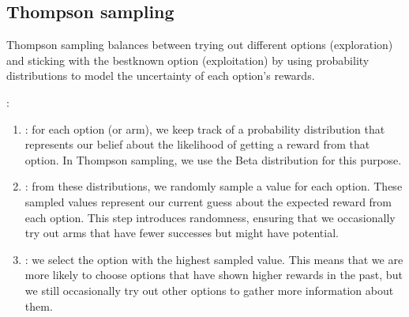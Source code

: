 \documentclass[letterpaper,10pt,english]{jupyterBook}
\begin{document}
\subsection{Thompson sampling}
\label{\detokenize{notebooks/bandits:thompson-sampling}}
\sphinxAtStartPar
Thompson sampling balances between trying out different options (exploration) and sticking with the best\sphinxhyphen{}known option (exploitation) by using probability distributions to model the uncertainty of each option’s rewards.

\sphinxAtStartPar
{}:
\begin{enumerate}
%
\item {} 
\sphinxAtStartPar
{}: for each option (or arm), we keep track of a probability distribution that represents our belief about the likelihood of getting a reward from that option. In Thompson sampling, we use the Beta distribution for this purpose.

\item {} 
\sphinxAtStartPar
{}: from these distributions, we randomly sample a value for each option. These sampled values represent our current guess about the expected reward from each option. This step introduces randomness, ensuring that we occasionally try out arms that have fewer successes but might have potential.

\item {} 
\sphinxAtStartPar
{}: we select the option with the highest sampled value. This means that we are more likely to choose options that have shown higher rewards in the past, but we still occasionally try out other options to gather more information about them.

\end{enumerate}
\end{document}
